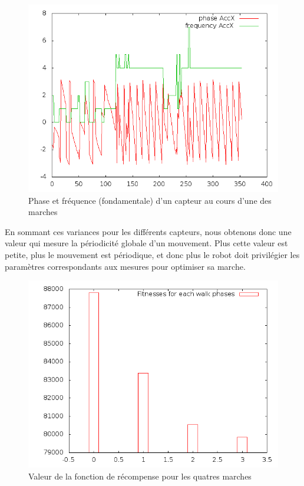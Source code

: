 \documentclass[11pt]{article}
\begin{document}
\begin{itemize}
\begin{figure}[h]
    \includegraphics[scale=0.6]{phase_freq.png}
    \caption{Phase et fréquence (fondamentale) d'un capteur au cours d'une des marches}
\end{figure}

\end{itemize}
En sommant ces variances pour les différents capteurs,
nous obtenons donc une valeur qui mesure la périodicité globale d'un mouvement. Plus cette valeur est petite, plus le mouvement est périodique, et donc plus le robot doit privilégier les paramètres correspondants aux mesures pour optimiser sa marche. 

\begin{figure}[h]
    \includegraphics[scale=0.6]{fitnesses.png}
    \caption{Valeur de la fonction de récompense pour les quatres marches}
\end{figure}
\end{document}
